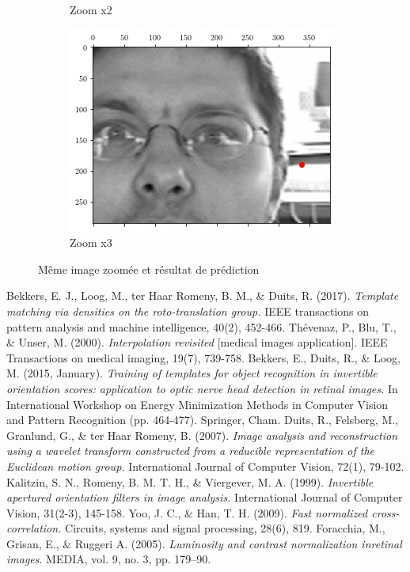 \documentclass{article}
\begin{document}
\begin{figure}[htpb]
\begin{subfigure}[b]{0.3\textwidth}
        \caption{Zoom x2}%
        \label{fig:radius}
      \end{subfigure}
      \quad
      \begin{subfigure}[b]{0.3\textwidth}
        \includegraphics[scale=0.4]{plots/zoom_3.jpeg}
        \caption{Zoom x3}%
        \label{fig:radius}
      \end{subfigure}
      \caption{Même image zoomée et résultat de prédiction}
      \label{fig:zoom}
    \end{figure}


\pagebreak

\begin{thebibliography}{9}

    Bekkers, E. J., Loog, M., ter Haar Romeny, B. M., \& Duits, R. (2017).
    \emph{Template matching via densities on the roto-translation group.}
    IEEE transactions on pattern analysis and machine intelligence, 40(2), 452-466.
    Thévenaz, P., Blu, T., \& Unser, M. (2000). \emph{Interpolation revisited} [medical
    images application]. IEEE Transactions on medical imaging, 19(7), 739-758.
    Bekkers, E., Duits, R., \& Loog, M. (2015, January). \emph{Training of templates for
      object recognition in invertible orientation scores: application to optic nerve
    head detection in retinal images.}
    In International Workshop on Energy Minimization Methods in Computer Vision and Pattern Recognition (pp. 464-477). Springer, Cham.
    Duits, R., Felsberg, M., Granlund, G., \& ter Haar Romeny, B. (2007).
    \emph{Image analysis and reconstruction using a wavelet transform constructed from a
    reducible representation of the Euclidean motion group.} International Journal of Computer Vision, 72(1), 79-102.
    Kalitzin, S. N., Romeny, B. M. T. H., \& Viergever, M. A. (1999).
    \emph{Invertible apertured orientation filters in image analysis.}
    International Journal of Computer Vision, 31(2-3), 145-158.
    Yoo, J. C., \& Han, T. H. (2009).
    \emph{Fast normalized cross-correlation.} Circuits, systems and signal processing, 28(6), 819.
    Foracchia, M., Grisan, E., \& Ruggeri A. (2005). \emph{Luminosity  and  contrast  normalization  inretinal images}.
    MEDIA, vol. 9, no. 3, pp. 179–90.
\end{thebibliography}

        
\end{document}
